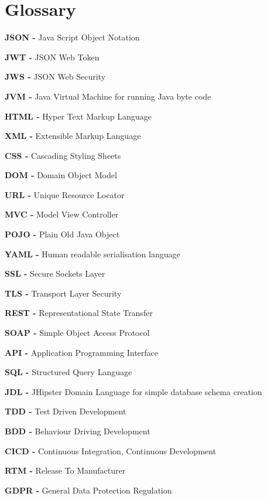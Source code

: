 \clearpage
\section*{Glossary}

\textbf{JSON -} Java Script Object Notation

\noindent
\textbf{JWT -} JSON Web Token

\noindent
\textbf{JWS -} JSON Web Security

\noindent
\textbf{JVM -} Java Virtual Machine for running Java byte code

\noindent
\textbf{HTML -} Hyper Text Markup Language

\noindent
\textbf{XML -} Extensible Markup Language

\noindent
\textbf{CSS - } Cascading Styling Sheets

\noindent
\textbf{DOM -} Domain Object Model

\noindent
\textbf{URL -} Unique Resource Locator

\noindent
\textbf{MVC -} Model View Controller

\noindent
\textbf{POJO -} Plain Old Java Object

\noindent
\textbf{YAML -} Human readable serialisation language

\noindent
\textbf{SSL -} Secure Sockets Layer

\noindent
\textbf{TLS -} Transport Layer Security

\noindent
\textbf{REST -} Representational State Transfer

\noindent
\textbf{SOAP -} Simple Object Access Protocol

\noindent
\textbf{API -} Application Programming Interface

\noindent
\textbf{SQL -} Structured Query Language

\noindent
\textbf{JDL -} JHipster Domain Language for simple database schema creation

\noindent
\textbf{TDD -} Test Driven Development

\noindent
\textbf{BDD -} Behaviour Driving Development

\noindent
\textbf{CICD -} Continuous Integration, Continuous Development

\noindent
\textbf{RTM -} Release To Manufacturer

\noindent
\textbf{GDPR -} General Data Protection Regulation